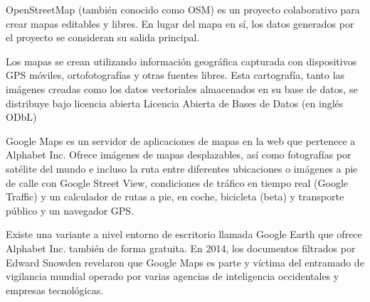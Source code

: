 OpenStreetMap (también conocido como OSM) es un proyecto colaborativo para crear mapas editables y libres. En lugar del mapa en sí, los datos generados por el proyecto se consideran su salida principal.

Los mapas se crean utilizando información geográfica capturada con dispositivos GPS móviles, ortofotografías y otras fuentes libres. Esta cartografía, tanto las imágenes creadas como los datos vectoriales almacenados en su base de datos, se distribuye bajo licencia abierta Licencia Abierta de Bases de Datos (en inglés ODbL)

Google Maps es un servidor de aplicaciones de mapas en la web que pertenece a Alphabet Inc. Ofrece imágenes de mapas desplazables, así como fotografías por satélite del mundo e incluso la ruta entre diferentes ubicaciones o imágenes a pie de calle con Google Street View, condiciones de tráfico en tiempo real (Google Traffic) y un calculador de rutas a pie, en coche, bicicleta (beta) y transporte público y un navegador GPS.

Existe una variante a nivel entorno de escritorio llamada Google Earth que ofrece Alphabet Inc. también de forma gratuita. En 2014, los documentos filtrados por Edward Snowden revelaron que Google Maps es parte y víctima del entramado de vigilancia mundial operado por varias agencias de inteligencia occidentales y empresas tecnológicas.